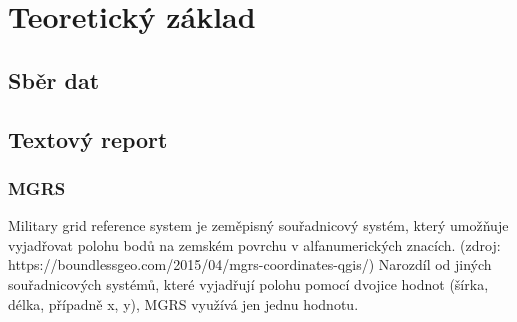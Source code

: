 \chapter{Teoretický základ}
\label{2-teorie}

\section{Sběr dat}


\section{Textový report}


\subsection{MGRS}
Military grid reference system je zeměpisný souřadnicový systém, který umožňuje vyjadřovat polohu bodů na zemském povrchu v alfanumerických znacích. (zdroj: https://boundlessgeo.com/2015/04/mgrs-coordinates-qgis/)
Narozdíl od jiných souřadnicových systémů, které vyjadřují polohu pomocí dvojice hodnot (šírka, délka, případně x, y), MGRS využívá jen jednu hodnotu.


